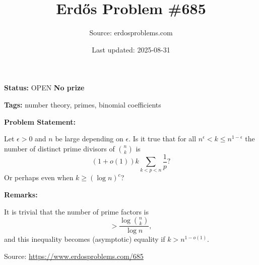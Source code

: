 \documentclass{article}
\title{Erd\H{o}s Problem \#685}
\date{Last updated: 2025-08-31}
\author{Source: erdosproblems.com}
\begin{document}
\maketitle

\noindent\textbf{Status:} OPEN \quad \textbf{No prize}

\noindent\textbf{Tags:} number theory, primes, binomial coefficients

\medskip
\noindent\textbf{Problem Statement:}

Let $\epsilon>0$ and $n$ be large depending on $\epsilon$. Is it true that for all $n^\epsilon<k\leq n^{1-\epsilon}$ the number of distinct prime divisors of $\binom{n}{k}$ is\[(1+o(1))k\sum_{k<p<n}\frac{1}{p}?\]Or perhaps even when $k \geq (\log n)^c$?

\bigskip
\noindent\textbf{Remarks:}

It is trivial that the number of prime factors is\[>\frac{\log \binom{n}{k}}{\log n},\]and this inequality becomes (asymptotic) equality if $k>n^{1-o(1)}$.

\bigskip
\noindent\small{Source: \url{https://www.erdosproblems.com/685}}
\end{document}
